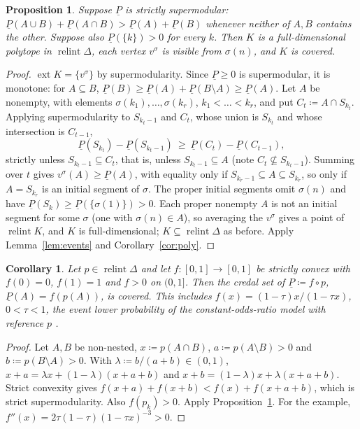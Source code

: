 \documentclass[11pt]{article}
\DeclareMathOperator{\relint}{relint}
\DeclareMathOperator{\ext}{ext}
\theoremstyle{plain}
\newtheorem{proposition}[theorem]{Proposition}
\newtheorem{corollary}[theorem]{Corollary}
\theoremstyle{definition}
\theoremstyle{remark}
\begin{document}
\begin{proposition}\label{prop:2mon}
Suppose $\underline P$ is \emph{strictly supermodular}: $\underline P(A\cup B)+
\underline P(A\cap B)>\underline P(A)+\underline P(B)$ whenever neither of $A,B$ contains
the other. Suppose also $\underline P(\{k\})>0$ for every $k$. Then $K$ is a
full-dimensional polytope in $\relint\Delta$, each vertex $v^\sigma$ is visible from
$\sigma(n)$, and $K$ is covered.
\end{proposition}

\begin{proof}
$\ext K=\{v^\sigma\}$ by supermodularity. Since $\underline P\ge0$ is supermodular, it is
monotone: for $A\subseteq B$, $\underline P(B)\ge\underline P(A)+\underline P(B\setminus
A)\ge\underline P(A)$. Let $A$ be nonempty, with elements $\sigma(k_1),\dots,\sigma(k_r)$,
$k_1<\dots<k_r$, and put $C_t\coloneqq A\cap S_{k_t}$. Applying supermodularity to
$S_{k_t-1}$ and $C_t$, whose union is $S_{k_t}$ and whose intersection is $C_{t-1}$,
\[
  \underline P(S_{k_t})-\underline P(S_{k_t-1})\ \ge\ \underline P(C_t)-\underline
  P(C_{t-1}),
\]
strictly unless $S_{k_t-1}\subseteq C_t$, that is, unless $S_{k_t-1}\subseteq A$ (note
$C_t\not\subseteq S_{k_t-1}$). Summing over $t$ gives $v^\sigma(A)\ge\underline P(A)$,
with equality only if $S_{k_r-1}\subseteq A\subseteq S_{k_r}$, so only if $A=S_{k_r}$ is an
initial segment of $\sigma$. The proper initial segments omit $\sigma(n)$ and have
$\underline P(S_k)\ge\underline P(\{\sigma(1)\})>0$. Each proper nonempty $A$ is not an
initial segment for some $\sigma$ (one with $\sigma(n)\in A$), so averaging the
$v^\sigma$ gives a point of $\relint K$, and $K$ is full-dimensional; $K\subseteq
\relint\Delta$ as before. Apply Lemma~\ref{lem:events} and Corollary~\ref{cor:poly}.
\end{proof}

\begin{corollary}\label{cor:distortion}
Let $p\in\relint\Delta$ and let $f:[0,1]\to[0,1]$ be strictly convex with $f(0)=0$,
$f(1)=1$ and $f>0$ on $(0,1]$. Then the credal set of $\underline P\coloneqq f\circ p$,
$\underline P(A)=f(p(A))$, is covered. This includes $f(x)=(1-\tau)x/(1-\tau x)$,
$0<\tau<1$, the event lower probability of the constant-odds-ratio model with reference
$p$ \cite{Walley}.
\end{corollary}

\begin{proof}
Let $A,B$ be non-nested, $x\coloneqq p(A\cap B)$, $a\coloneqq p(A\setminus B)>0$ and
$b\coloneqq p(B\setminus A)>0$. With $\lambda\coloneqq b/(a+b)\in(0,1)$, $x+a=\lambda x+
(1-\lambda)(x+a+b)$ and $x+b=(1-\lambda)x+\lambda(x+a+b)$. Strict convexity gives
$f(x+a)+f(x+b)<f(x)+f(x+a+b)$, which is strict supermodularity. Also $f(p_k)>0$. Apply
Proposition~\ref{prop:2mon}. For the example, $f''(x)=2\tau(1-\tau)(1-\tau x)^{-3}>0$.
\end{proof}
\end{document}
